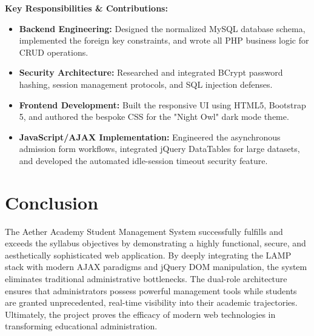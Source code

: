 \documentclass[12pt, a4paper]{report}
\begin{document}
\textbf{Key Responsibilities \& Contributions:}
\begin{itemize}
    \item \textbf{Backend Engineering:} Designed the normalized MySQL database schema, implemented the foreign key constraints, and wrote all PHP business logic for CRUD operations.
    \item \textbf{Security Architecture:} Researched and integrated BCrypt password hashing, session management protocols, and SQL injection defenses.
    \item \textbf{Frontend Development:} Built the responsive UI using HTML5, Bootstrap 5, and authored the bespoke CSS for the "Night Owl" dark mode theme.
    \item \textbf{JavaScript/AJAX Implementation:} Engineered the asynchronous admission form workflows, integrated jQuery DataTables for large datasets, and developed the automated idle-session timeout security feature.
\end{itemize}

\chapter{Conclusion}
The Aether Academy Student Management System successfully fulfills and exceeds the syllabus objectives by demonstrating a highly functional, secure, and aesthetically sophisticated web application. By deeply integrating the LAMP stack with modern AJAX paradigms and jQuery DOM manipulation, the system eliminates traditional administrative bottlenecks. The dual-role architecture ensures that administrators possess powerful management tools while students are granted unprecedented, real-time visibility into their academic trajectories. Ultimately, the project proves the efficacy of modern web technologies in transforming educational administration.

\end{document}
